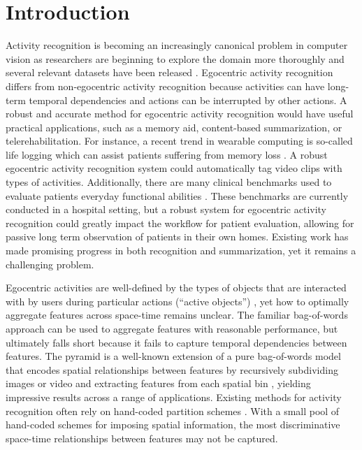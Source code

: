 \documentclass{bmvc2k}
\begin{document}
\section{Introduction}
	Activity recognition is becoming an increasingly canonical problem in
	computer vision as researchers are beginning to explore the domain more
  thoroughly and several relevant datasets have been released 
  \cite{Schuldt04, Rodriguez08, Fathi11, Ramanan12}. 
  Egocentric activity recognition differs from
  non-egocentric activity recognition because activities can have long-term
  temporal dependencies and actions can be interrupted by other actions. 
	A robust and accurate method for egocentric activity recognition would have 
	useful practical applications, such as a memory aid, content-based
  summarization, or telerehabilitation. For instance,
	a recent trend in wearable computing is so-called life logging which can
	assist patients suffering from memory loss \cite{Sellen07}. 
	A robust egocentric activity recognition
	system could automatically tag video clips with types of activities.
  Additionally, there are many clinical benchmarks used to evaluate patients everyday
  functional abilities \cite{Kopp97, Catz97, Itzkovich07}. 
  These benchmarks are currently conducted in a
  hospital setting, but a robust system for egocentric activity
  recognition
  could greatly impact the workflow for patient evaluation, allowing
  for passive long term observation of patients in their own
  homes.
  Existing work has made promising progress in both recognition and
  summarization, \cite{Ramanan12, Fathi12,Lee12} 
  yet it remains a challenging problem.






  Egocentric activities
  are well-defined by the types of objects that are interacted with by users
  during particular actions (``active objects'') \cite{Ramanan12}, yet how to optimally aggregate
  features across space-time remains unclear.
  The familiar bag-of-words approach can be used to aggregate 
  features with reasonable performance, but ultimately falls short because it
  fails to capture temporal dependencies between features.
  The pyramid is a well-known extension of a pure bag-of-words model that encodes spatial
  relationships between features by recursively subdividing images or video and extracting 
  features from each spatial bin \cite{Lazebnik06}, yielding impressive
  results across a range of applications.
  Existing methods for activity recognition often rely on
  hand-coded partition schemes \cite{Ramanan12, Choi08, Laptev08}.
  With a small pool of hand-coded schemes for imposing spatial
  information, the most discriminative space-time relationships between features may not be 
  captured. 
\end{document}
